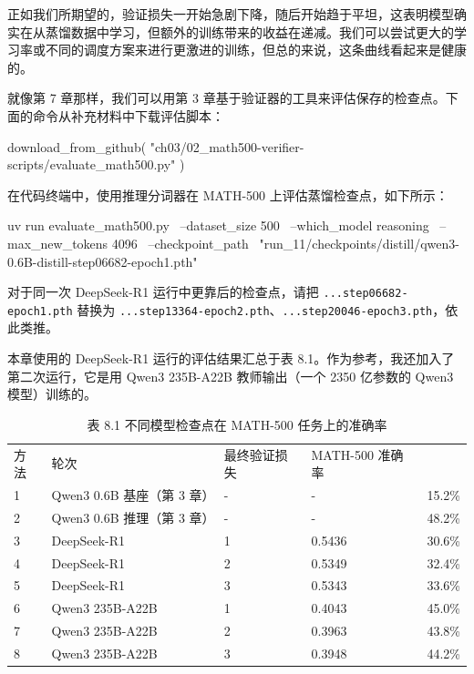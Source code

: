 正如我们所期望的，验证损失一开始急剧下降，随后开始趋于平坦，这表明模型确实在从蒸馏数据中学习，但额外的训练带来的收益在递减。我们可以尝试更大的学习率或不同的调度方案来进行更激进的训练，但总的来说，这条曲线看起来是健康的。

就像第 7 章那样，我们可以用第 3 章基于验证器的工具来评估保存的检查点。下面的命令从补充材料中下载评估脚本：

\begin{codebox}
download_from_github(
    "ch03/02_math500-verifier-scripts/evaluate_math500.py"
)
\end{codebox}

在代码终端中，使用推理分词器在 MATH-500 上评估蒸馏检查点，如下所示：

\begin{codebox}
uv run evaluate_math500.py \
--dataset_size 500 \
--which_model reasoning \
--max_new_tokens 4096 \
--checkpoint_path \
"run_11/checkpoints/distill/qwen3-0.6B-distill-step06682-epoch1.pth"
\end{codebox}

对于同一次 DeepSeek-R1 运行中更靠后的检查点，请把 \texttt{...step06682-epoch1.pth} 替换为 \texttt{...step13364-epoch2.pth}、\texttt{...step20046-epoch3.pth}，依此类推。

本章使用的 DeepSeek-R1 运行的评估结果汇总于表 8.1。作为参考，我还加入了第二次运行，它是用 Qwen3 235B-A22B 教师输出（一个 2350 亿参数的 Qwen3 模型）训练的。

\begin{table}[htbp]
\centering\small
\centering
\caption{表 8.1 不同模型检查点在 MATH-500 任务上的准确率}
\begin{tabularx}{\linewidth}{XXXXX}
\toprule
方法 & 轮次 & 最终验证损失 & MATH-500 准确率 &  \\
1 & Qwen3 0.6B 基座（第 3 章） & - & - & 15.2\% \\
2 & Qwen3 0.6B 推理（第 3 章） & - & - & 48.2\% \\
3 & DeepSeek-R1 & 1 & 0.5436 & 30.6\% \\
4 & DeepSeek-R1 & 2 & 0.5349 & 32.4\% \\
5 & DeepSeek-R1 & 3 & 0.5343 & 33.6\% \\
6 & Qwen3 235B-A22B & 1 & 0.4043 & 45.0\% \\
7 & Qwen3 235B-A22B & 2 & 0.3963 & 43.8\% \\
8 & Qwen3 235B-A22B & 3 & 0.3948 & 44.2\% \\ \bottomrule
\end{tabularx}
\end{table}

